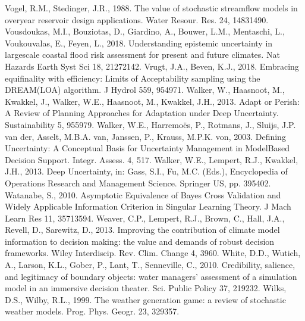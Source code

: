 \documentclass[letterpaper,10pt,english]{sphinxmanual}
\begin{document}
Vogel, R.M., Stedinger, J.R., 1988. The value of stochastic streamflow models in overyear reservoir design applications. Water Resour. Res. 24, 1483\textendash{}1490. 
Vousdoukas, M.I., Bouziotas, D., Giardino, A., Bouwer, L.M., Mentaschi, L., Voukouvalas, E., Feyen, L., 2018. Understanding epistemic uncertainty in large\sphinxhyphen{}scale coastal flood risk assessment for present and future climates. Nat Hazards Earth Syst Sci 18, 2127\textendash{}2142. 
Vrugt, J.A., Beven, K.J., 2018. Embracing equifinality with efficiency: Limits of Acceptability sampling using the DREAM(LOA) algorithm. J Hydrol 559, 954\textendash{}971. 
Walker, W., Haasnoot, M., Kwakkel, J., Walker, W.E., Haasnoot, M., Kwakkel, J.H., 2013. Adapt or Perish: A Review of Planning Approaches for Adaptation under Deep Uncertainty. Sustainability 5, 955\textendash{}979. 
Walker, W.E., Harremoës, P., Rotmans, J., Sluijs, J.P. van der, Asselt, M.B.A. van, Janssen, P., Krauss, M.P.K. von, 2003. Defining Uncertainty: A Conceptual Basis for Uncertainty Management in Model\sphinxhyphen{}Based Decision Support. Integr. Assess. 4, 5\textendash{}17. 
Walker, W.E., Lempert, R.J., Kwakkel, J.H., 2013. Deep Uncertainty, in: Gass, S.I., Fu, M.C. (Eds.), Encyclopedia of Operations Research and Management Science. Springer US, pp. 395\textendash{}402. 
Watanabe, S., 2010. Asymptotic Equivalence of Bayes Cross Validation and Widely Applicable Information Criterion in Singular Learning Theory. J Mach Learn Res 11, 3571\textendash{}3594.
Weaver, C.P., Lempert, R.J., Brown, C., Hall, J.A., Revell, D., Sarewitz, D., 2013. Improving the contribution of climate model information to decision making: the value and demands of robust decision frameworks. Wiley Interdiscip. Rev. Clim. Change 4, 39\textendash{}60. 
White, D.D., Wutich, A., Larson, K.L., Gober, P., Lant, T., Senneville, C., 2010. Credibility, salience, and legitimacy of boundary objects: water managers’ assessment of a simulation model in an immersive decision theater. Sci. Public Policy 37, 219\textendash{}232. 
Wilks, D.S., Wilby, R.L., 1999. The weather generation game: a review of stochastic weather models. Prog. Phys. Geogr. 23, 329\textendash{}357.
\end{document}
